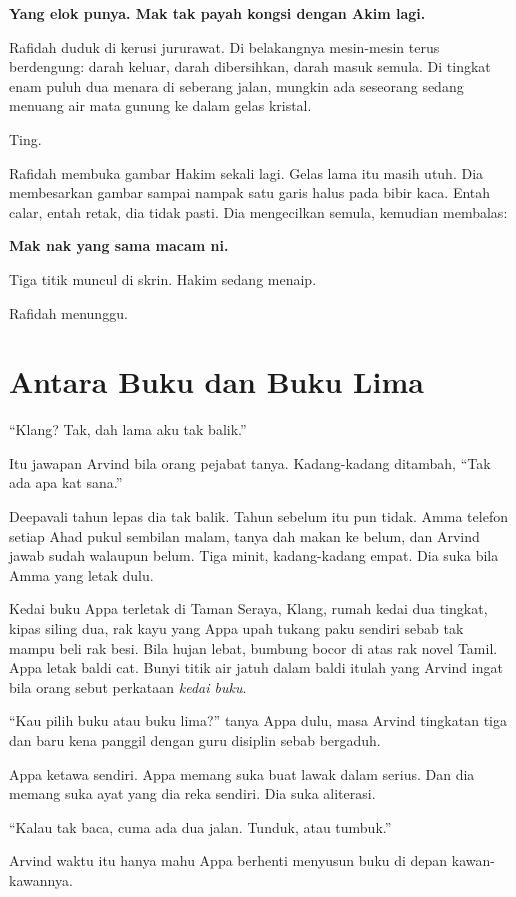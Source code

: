 \documentclass[
  11pt,
  a5paper,
  openany,
  oneside]{book}
\begin{document}
\textbf{Yang elok punya. Mak tak payah kongsi dengan Akim lagi.}

Rafidah duduk di kerusi jururawat. Di belakangnya mesin-mesin terus
berdengung: darah keluar, darah dibersihkan, darah masuk semula. Di
tingkat enam puluh dua menara di seberang jalan, mungkin ada seseorang
sedang menuang air mata gunung ke dalam gelas kristal.

Ting.

Rafidah membuka gambar Hakim sekali lagi. Gelas lama itu masih utuh. Dia
membesarkan gambar sampai nampak satu garis halus pada bibir kaca. Entah
calar, entah retak, dia tidak pasti. Dia mengecilkan semula, kemudian
membalas:

\textbf{Mak nak yang sama macam ni.}

Tiga titik muncul di skrin. Hakim sedang menaip.

Rafidah menunggu.

\chapter{Antara Buku dan Buku Lima}\label{antara-buku-dan-buku-lima}

``Klang? Tak, dah lama aku tak balik.''

Itu jawapan Arvind bila orang pejabat tanya. Kadang-kadang ditambah,
``Tak ada apa kat sana.''

Deepavali tahun lepas dia tak balik. Tahun sebelum itu pun tidak. Amma
telefon setiap Ahad pukul sembilan malam, tanya dah makan ke belum, dan
Arvind jawab sudah walaupun belum. Tiga minit, kadang-kadang empat. Dia
suka bila Amma yang letak dulu.

Kedai buku Appa terletak di Taman Seraya, Klang, rumah kedai dua
tingkat, kipas siling dua, rak kayu yang Appa upah tukang paku sendiri
sebab tak mampu beli rak besi. Bila hujan lebat, bumbung bocor di atas
rak novel Tamil. Appa letak baldi cat. Bunyi titik air jatuh dalam baldi
itulah yang Arvind ingat bila orang sebut perkataan \emph{kedai buku}.

``Kau pilih buku atau buku lima?'' tanya Appa dulu, masa Arvind
tingkatan tiga dan baru kena panggil dengan guru disiplin sebab
bergaduh.

Appa ketawa sendiri. Appa memang suka buat lawak dalam serius. Dan dia
memang suka ayat yang dia reka sendiri. Dia suka aliterasi.

``Kalau tak baca, cuma ada dua jalan. Tunduk, atau tumbuk.''

Arvind waktu itu hanya mahu Appa berhenti menyusun buku di depan
kawan-kawannya.
\end{document}
